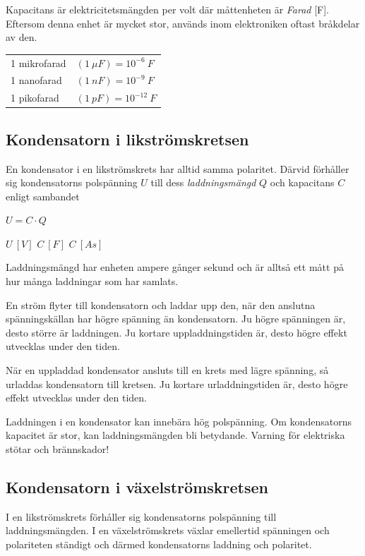 Kapacitans är elektricitetsmängden per volt där måttenheten är \emph{Farad} [F].
Eftersom denna enhet är mycket stor, används inom elektroniken oftast bråkdelar
av den.

\begin{tabular}{ll}
1 mikrofarad & \((1\ \mu F) = 10^{-6}\ F\) \\
1 nanofarad & \((1\ nF) = 10^{-9}\ F\) \\
1 pikofarad & \((1\ pF) = 10^{-12}\ F\) \\
\end{tabular}

\subsection{Kondensatorn i likströmskretsen}

En kondensator i en likströmskrets har alltid samma polaritet.
Därvid förhåller sig kondensatorns polspänning \(U\) till dess
\emph{laddningsmängd} \(Q\) och kapacitans \(C\) enligt sambandet

\(U = C \cdot Q\)

\(U\ [V]\) \(C\ [F]\) \(C\ [As]\)

Laddningsmängd har enheten ampere gånger sekund och är alltså ett mått på hur
många laddningar som har samlats.

En ström flyter till kondensatorn och laddar upp den, när den anslutna
spänningskällan har högre spänning än kondensatorn. Ju högre spänningen är,
desto större är laddningen. Ju kortare uppladdningstiden är, desto högre effekt
utvecklas under den tiden.

När en uppladdad kondensator ansluts till en krets med lägre spänning, så
urladdas kondensatorn till kretsen. Ju kortare urladdningstiden är, desto högre
effekt utvecklas under den tiden.

Laddningen i en kondensator kan innebära hög polspänning. Om kondensatorns
kapacitet är stor, kan laddningsmängden bli betydande. Varning för elektriska
stötar och brännskador!

\subsection{Kondensatorn i växelströmskretsen}

I en likströmskrets förhåller sig kondensatorns polspänning till
laddningsmängden. I en växelströmskrets växlar emellertid spänningen och
polariteten ständigt och därmed kondensatorns laddning och polaritet.

